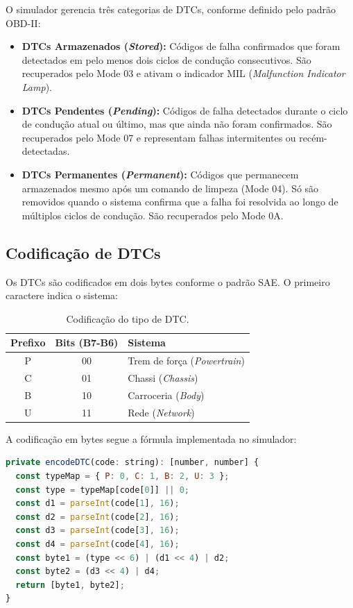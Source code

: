 O simulador gerencia três categorias de DTCs, conforme definido pelo padrão OBD-II:

\begin{itemize}
    \item \textbf{DTCs Armazenados (\textit{Stored}):} Códigos de falha confirmados que foram detectados em pelo menos dois ciclos de condução consecutivos. São recuperados pelo Mode 03 e ativam o indicador MIL (\textit{Malfunction Indicator Lamp}).
    
    \item \textbf{DTCs Pendentes (\textit{Pending}):} Códigos de falha detectados durante o ciclo de condução atual ou último, mas que ainda não foram confirmados. São recuperados pelo Mode 07 e representam falhas intermitentes ou recém-detectadas.
    
    \item \textbf{DTCs Permanentes (\textit{Permanent}):} Códigos que permanecem armazenados mesmo após um comando de limpeza (Mode 04). Só são removidos quando o sistema confirma que a falha foi resolvida ao longo de múltiplos ciclos de condução. São recuperados pelo Mode 0A.
\end{itemize}

\subsection{Codificação de DTCs}

Os DTCs são codificados em dois bytes conforme o padrão SAE. O primeiro caractere indica o sistema:

\begin{table}[H]
\centering
\caption{Codificação do tipo de DTC.}
\label{tab:dtc-encoding}
\begin{tabular}{@{}ccl@{}}
\toprule
\textbf{Prefixo} & \textbf{Bits (B7-B6)} & \textbf{Sistema} \\
\midrule
P & 00 & Trem de força (\textit{Powertrain}) \\
C & 01 & Chassi (\textit{Chassis}) \\
B & 10 & Carroceria (\textit{Body}) \\
U & 11 & Rede (\textit{Network}) \\
\bottomrule
\end{tabular}
\end{table}

A codificação em bytes segue a fórmula implementada no simulador:

\begin{lstlisting}[language=JavaScript, caption={Codificação de DTC em bytes.}, label={lst:dtc-encode}]
private encodeDTC(code: string): [number, number] {
  const typeMap = { P: 0, C: 1, B: 2, U: 3 };
  const type = typeMap[code[0]] || 0;
  const d1 = parseInt(code[1], 16);
  const d2 = parseInt(code[2], 16);
  const d3 = parseInt(code[3], 16);
  const d4 = parseInt(code[4], 16);
  const byte1 = (type << 6) | (d1 << 4) | d2;
  const byte2 = (d3 << 4) | d4;
  return [byte1, byte2];
}
\end{lstlisting}

